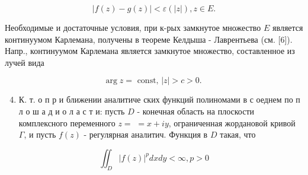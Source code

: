\documentclass[10pt]{article}
\begin{document}
\[

|f(z)-g(z)|<\varepsilon(|z|), z \in E .

\]



Необходимые и достаточные условия, при к-рых замкнутое множество $E$ является континуумом Карлемана, получены в теореме Келдыша - Лаврентьева (см. [6]). Напр., континуумом Карлемана является замкнутое множество, составленное из лучей вида



\[

\arg z=\text { const, }|z|>c>0 \text {. }

\]



\begin{enumerate}

  \setcounter{enumi}{3}

  \item К. т. о п р и ближении аналитиче ских функций полиномами в с оеднем по п л о ш а д и о л а с т и: пусть $D$ - конечная область на плоскости комплексного переменного $z=$ $=x+i y$, ограниченная жордановой кривой $\Gamma$, и пусть $f(z)$ - регулярная аналитич. Функция в $D$ такая, что

\end{enumerate}



\[

\iint_{D}|f(z)|^{p} d x d y<\infty, p>0

\]
\end{document}
